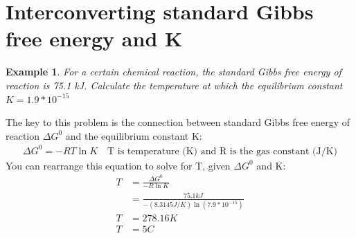 \documentclass{article}  %
\newtheorem{exmp}{Example}
\begin{document}
\section*{Interconverting standard Gibbs free energy and K}
\begin{exmp}
    For a certain chemical reaction, the standard Gibbs free energy of reaction is 75.1 kJ. Calculate the temperature at which the equilibrium constant $K=1.9*10^{-15}$
\end{exmp}
The key to this problem is the connection between standard Gibbs free energy of reaction $\Delta G^0$ and the equilibrium constant K:
\begin{equation*}
    \begin{aligned}
        \Delta G^0 = -RT\ln K \quad \text{T is temperature (K) and R is the gas constant (J/K)}
    \end{aligned}
\end{equation*}
You can rearrange this equation to solve for T, given $\Delta G^0$ and K:
    \begin{equation*}
        \begin{aligned}
            T &= \frac{\Delta G^0}{-R \ln K} \\
            &= \frac{75.1 kJ}{-(8.3145 J/K)\ln(7.9*10^{-15})} \\
            T &= 278.16 K \\
            T &= 5C 
        \end{aligned}
    \end{equation*}
\end{document}
